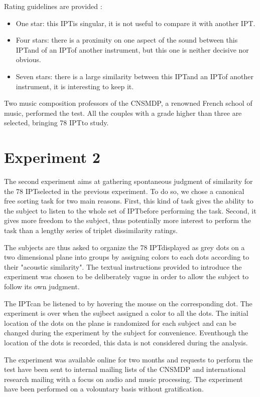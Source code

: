 \documentclass{article}
\newcommand{\ipt}{IPT}
\begin{document}
Rating guidelines are provided :
\begin{itemize}
  \item One star: this \ipt is singular, it is not useful to compare it with another \ipt.
  \item Four stars: there is a proximity on one aspect of the sound between this \ipt and of an \ipt of another instrument, but this one is neither decisive nor obvious.
  \item Seven stars: there is a large similarity between this \ipt and an \ipt of another instrument, it is interesting to keep it.
\end{itemize}

Two music composition professors of the CNSMDP, a renowned French school of music, performed the test. All the couples with a grade higher than three are selected, bringing 78 \ipt to study.

\section{Experiment 2}\label{sec:xp2}

The second experiment aims at gathering spontaneous judgment of similarity for the 78 \ipt selected in the previous experiment. To do so, we chose a canonical free sorting task for two main reasons. First, this kind of task gives the ability to the subject to listen to the whole set of \ipt before performing the task. Second, it gives more freedom to the subject, thus potentially more interest to perform the task than a lengthy series of triplet dissimilarity ratings.

The subjects are thus asked to organize the 78 \ipt displayed as grey dots on a two dimensional plane into groups by assigning colors to each dots according to their "acoustic similarity". The textual instructions provided to introduce the experiment was chosen to be deliberately vague in order to allow the subject to follow its own judgment.

The \ipt can be listened to by hovering the mouse on the corresponding dot. The experiment is over when the sujbect assigned a color to all the dots. The initial location of the dots on the plane is randomized for each subject and can be changed during the experiment by the subject for convenience. Eventhough the location of the dots is recorded, this data is not considered during the analysis.

The experiment was available online for two months and requests to perform the test have been sent to internal mailing lists of the CNSMDP and international research mailing with a focus on audio and music processing. The experiment have been performed on a volountary basis without gratification.
\end{document}
